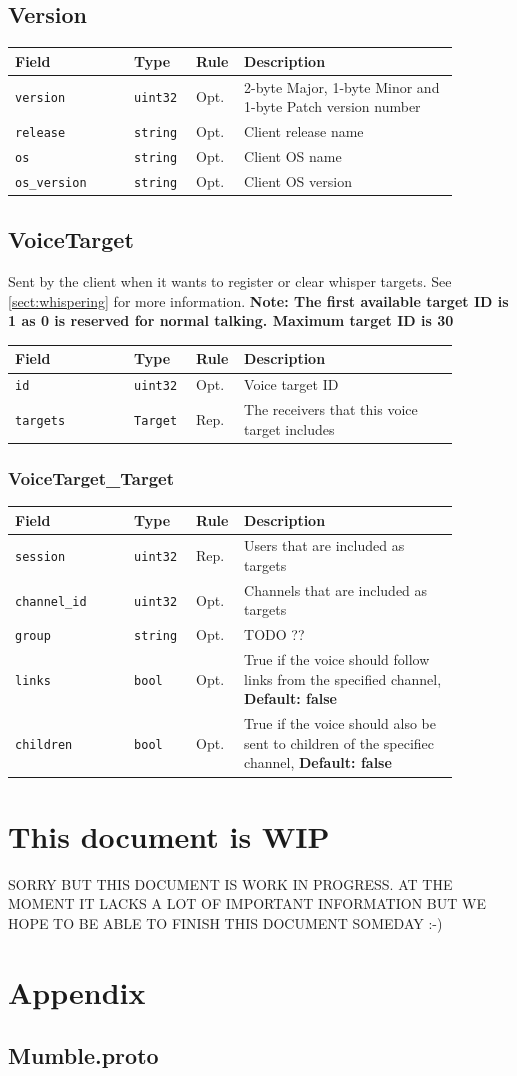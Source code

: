 \documentclass[11pt]{article} %
\newenvironment{mumbleMessageEx}
{%
	\small
	\renewcommand\arraystretch{1.5}
	\begin{tabular}{p{0.25\linewidth}p{0.13\linewidth}p{0.05\linewidth}p{0.45\linewidth}}
	Field & Type & Rule & Description \\
	\hline
}
{%
	\end{tabular}
	\renewcommand\arraystretch{1.0}
}
\newcommand{\mumbleMessageExItem}[4]{ \texttt{#1} & \texttt{#2} & #3 & #4 \\ }
\begin{document}
\subsection{Version}
\label{msg:version}

\begin{mumbleMessageEx}
\mumbleMessageExItem{version}{uint32}{Opt.}{2-byte Major, 1-byte Minor and 1-byte Patch version number}
\mumbleMessageExItem{release}{string}{Opt.}{Client release name}
\mumbleMessageExItem{os}{string}{Opt.}{Client OS name}
\mumbleMessageExItem{os\_version}{string}{Opt.}{Client OS version}
\end{mumbleMessageEx}

\subsection{VoiceTarget}
\label{msg:voiceTarget}

Sent by the client when it wants to register or clear whisper targets. See \ref{sect:whispering} for more information. \textbf{Note: The first available target ID is 1 as 0 is reserved for normal talking. Maximum target ID is 30}

\begin{mumbleMessageEx}
\mumbleMessageExItem{id}{uint32}{Opt.}{Voice target ID}
\mumbleMessageExItem{targets}{Target}{Rep.}{The receivers that this voice target includes}
\end{mumbleMessageEx}

\subsubsection{VoiceTarget\_Target}
\label{msg:voiceTarget:target}

\begin{mumbleMessageEx}
\mumbleMessageExItem{session}{uint32}{Rep.}{Users that are included as targets}
\mumbleMessageExItem{channel\_id}{uint32}{Opt.}{Channels that are included as targets}
\mumbleMessageExItem{group}{string}{Opt.}{TODO ??}
\mumbleMessageExItem{links}{bool}{Opt.}{True if the voice should follow links from the specified channel, \textbf{Default: false}}
\mumbleMessageExItem{children}{bool}{Opt.}{True if the voice should also be sent to children of the specifiec channel, \textbf{Default: false}}
\end{mumbleMessageEx}




\section {This document is WIP}
SORRY BUT THIS DOCUMENT IS WORK IN PROGRESS. AT THE MOMENT IT LACKS A LOT OF IMPORTANT INFORMATION BUT WE HOPE TO BE ABLE TO FINISH THIS DOCUMENT SOMEDAY :-)

\appendix
\section{Appendix}
\subsection{Mumble.proto}
\label{appendix:mumble_proto}
\end{document}
